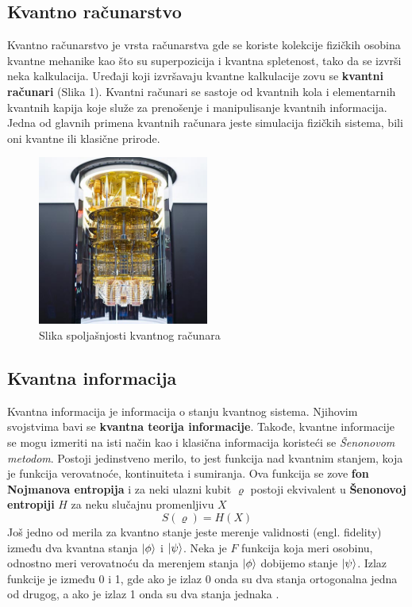 \documentclass[12pt, letterpaper, oneside]{article}
\begin{document}
\subsection{Kvantno računarstvo}
Kvantno računarstvo je vrsta računarstva gde se koriste kolekcije fizičkih osobina kvantne mehanike kao što su superpozicija i kvantna spletenost,
tako da se izvrši neka kalkulacija. Uređaji koji izvršavaju kvantne kalkulacije zovu se \textbf{kvantni računari} (Slika 1).
Kvantni računari se sastoje od kvantnih kola i elementarnih kvantnih kapija koje služe za prenošenje i manipulisanje kvantnih informacija.
\cite{nielsen_chuang_10th} \\
Jedna od glavnih primena kvantnih računara jeste simulacija fizičkih sistema, bili oni kvantne ili klasične prirode.
\begin{figure}[ht]
    \centering
    \includegraphics[width=0.5\textwidth]{files/media_sizes_full_QC-stack-fig-2.jpg}
    \caption{Slika spoljašnjosti kvantnog računara \cite{QuantumComputerImage}}
\end{figure}

\subsection{Kvantna informacija}
Kvantna informacija je informacija o stanju kvantnog sistema. Njihovim svojstvima bavi se \textbf{kvantna teorija informacije}.
Takođe, kvantne informacije se mogu izmeriti na isti način kao i klasična informacija koristeći se \textit{Šenonovom metodom}. 
Postoji jedinstveno merilo, to jest funkcija nad kvantnim stanjem, koja je funkcija verovatnoće, kontinuiteta i sumiranja.\cite{vlatko_v}
Ova funkcija se zove \textbf{fon Nojmanova entropija} i za neki ulazni kubit $\varrho$ postoji ekvivalent u \textbf{Šenonovoj entropiji} $H$
za neku slučajnu promenljivu $X$
\[
    S(\varrho) = H(X)
\]
Još jedno od merila za kvantno stanje jeste merenje validnosti (engl. fidelity) između dva kvantna stanja $\ket{\phi}$ i $\ket{\psi}$.
Neka je $F$ funkcija koja meri osobinu, odnostno meri verovatnoću da merenjem stanja $\ket{\phi}$ dobijemo stanje $\ket{\psi}$.
Izlaz funkcije je između 0 i 1, gde ako je izlaz 0 onda su dva stanja ortogonalna jedna od drugog, a ako je izlaz 1 onda su dva stanja jednaka \cite{vlatko_v}.
\end{document}
